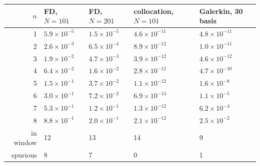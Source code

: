 \begin{tabular}{rllll}
\toprule
$n$ & FD, $N=101$ & FD, $N=201$ & collocation, $N=101$ & Galerkin, 30 basis\\
\midrule
1 & $5.9\times10^{-5}$ & $1.5\times10^{-5}$ & $4.6\times10^{-11}$ & $4.8\times10^{-11}$\\
2 & $2.6\times10^{-3}$ & $6.5\times10^{-4}$ & $8.9\times10^{-12}$ & $1.0\times10^{-11}$\\
3 & $1.9\times10^{-2}$ & $4.7\times10^{-3}$ & $3.9\times10^{-12}$ & $4.6\times10^{-12}$\\
4 & $6.4\times10^{-2}$ & $1.6\times10^{-2}$ & $2.8\times10^{-12}$ & $4.7\times10^{-10}$\\
5 & $1.5\times10^{-1}$ & $3.7\times10^{-2}$ & $1.1\times10^{-12}$ & $1.6\times10^{-8}$\\
6 & $3.0\times10^{-1}$ & $7.2\times10^{-2}$ & $6.9\times10^{-13}$ & $1.1\times10^{-5}$\\
7 & $5.3\times10^{-1}$ & $1.2\times10^{-1}$ & $1.3\times10^{-12}$ & $6.2\times10^{-4}$\\
8 & $8.8\times10^{-1}$ & $2.0\times10^{-1}$ & $2.1\times10^{-12}$ & $2.5\times10^{-2}$\\
\midrule
in window & 12 & 13 & 14 & 9\\
spurious & 8 & 7 & 0 & 1\\
\bottomrule
\end{tabular}
